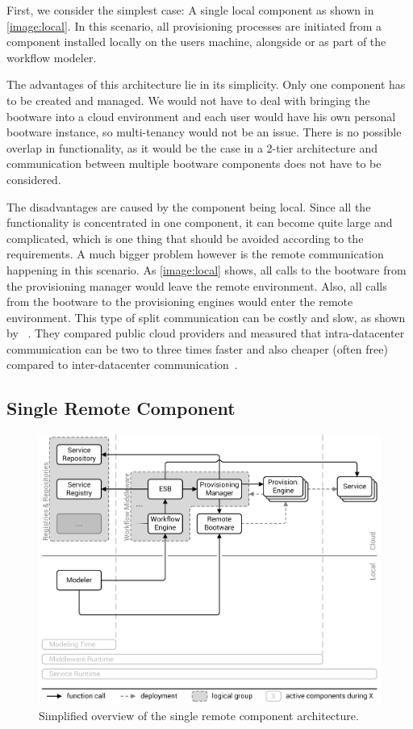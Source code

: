 First, we consider the simplest case: A single local component as shown in \autoref{image:local}.
In this scenario, all provisioning processes are initiated from a component installed locally on the users machine, alongside or as part of the workflow modeler.

The advantages of this architecture lie in its simplicity.
Only one component has to be created and managed.
We would not have to deal with bringing the bootware into a cloud environment and each user would have his own personal bootware instance, so multi-tenancy would not be an issue.
There is no possible overlap in functionality, as it would be the case in a 2-tier architecture and communication between multiple bootware components does not have to be considered.

The disadvantages are caused by the component being local.
Since all the functionality is concentrated in one component, it can become quite large and complicated, which is one thing that should be avoided according to the requirements.
A much bigger problem however is the remote communication happening in this scenario.
As \autoref{image:local} shows, all calls to the bootware from the provisioning manager would leave the remote environment.
Also, all calls from the bootware to the provisioning engines would enter the remote environment.
This type of split communication can be costly and slow, as shown by \citeauthor*{cloudcmp}~\autocite{cloudcmp}.
They compared public cloud providers and measured that intra-datacenter communication can be two to three times faster and also cheaper (often free) compared to inter-datacenter communication~\autocite{cloudcmp}.

\subsection{Single Remote Component}

\begin{figure}[!htbp]
	\centering
	\includegraphics[resolution=600]{design/assets/remote}
	\caption{Simplified overview of the single remote component architecture.}
	\label{image:remote}
\end{figure}

